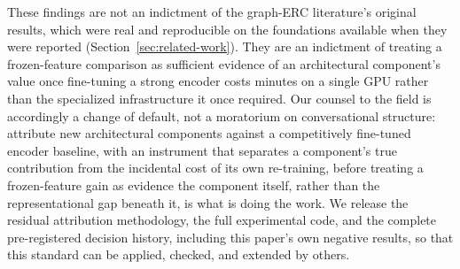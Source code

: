 These findings are not an indictment of the graph-ERC literature's original results, which were real and reproducible on the foundations available when they were reported (Section~\ref{sec:related-work}). They are an indictment of treating a frozen-feature comparison as sufficient evidence of an architectural component's value once fine-tuning a strong encoder costs minutes on a single GPU rather than the specialized infrastructure it once required. Our counsel to the field is accordingly a change of default, not a moratorium on conversational structure: attribute new architectural components against a competitively fine-tuned encoder baseline, with an instrument that separates a component's true contribution from the incidental cost of its own re-training, before treating a frozen-feature gain as evidence the component itself, rather than the representational gap beneath it, is what is doing the work. We release the residual attribution methodology, the full experimental code, and the complete pre-registered decision history, including this paper's own negative results, so that this standard can be applied, checked, and extended by others.
